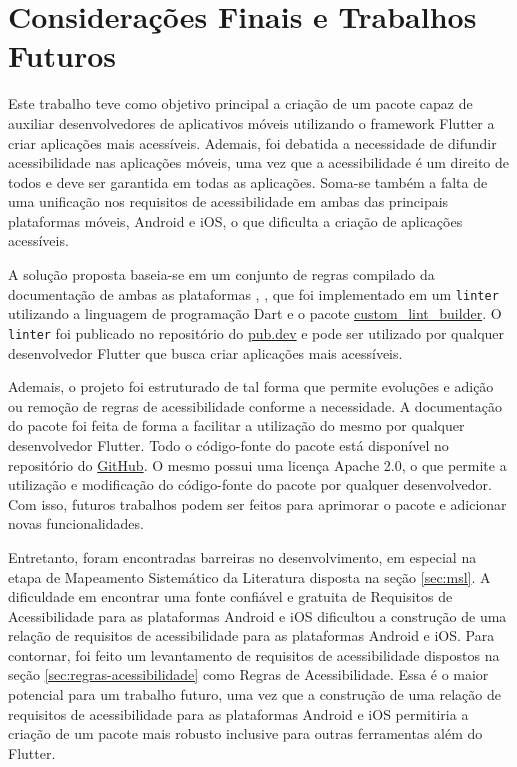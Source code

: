 \chapter{Considerações Finais e Trabalhos Futuros}

Este trabalho teve como objetivo principal a criação de um pacote capaz de auxiliar desenvolvedores de aplicativos móveis utilizando o framework Flutter a criar aplicações mais acessíveis. Ademais, foi debatida a necessidade de difundir acessibilidade nas aplicações móveis, uma vez que a acessibilidade é um direito de todos e deve ser garantida em todas as aplicações. Soma-se também a falta de uma unificação nos requisitos de acessibilidade em ambas das principais plataformas móveis, Android e iOS, o que dificulta a criação de aplicações acessíveis.

A solução proposta baseia-se em um conjunto de regras compilado da documentação de ambas as plataformas \cite{iosaccessibility}, \cite{androidaccessibility}, que foi implementado em um \texttt{linter} utilizando a linguagem de programação Dart e o pacote \href{https://pub.dev/packages/custom_lint_builder}{custom\_lint\_builder}. O \texttt{linter} foi publicado no repositório do \href{https://pub.dev/packages/accessibility_lint}{pub.dev} e pode ser utilizado por qualquer desenvolvedor Flutter que busca criar aplicações mais acessíveis.

Ademais, o projeto foi estruturado de tal forma que permite evoluções e adição ou remoção de regras de acessibilidade conforme a necessidade. A documentação do pacote foi feita de forma a facilitar a utilização do mesmo por qualquer desenvolvedor Flutter. Todo o código-fonte do pacote está disponível no repositório do \href{https://github.com/MateuxLucax/accessibility-lint}{GitHub}. O mesmo possui uma licença Apache 2.0, o que permite a utilização e modificação do código-fonte do pacote por qualquer desenvolvedor. Com isso, futuros trabalhos podem ser feitos para aprimorar o pacote e adicionar novas funcionalidades.

Entretanto, foram encontradas barreiras no desenvolvimento, em especial na etapa de Mapeamento Sistemático da Literatura disposta na seção \ref{sec:msl}. A dificuldade em encontrar uma fonte confiável e gratuita de Requisitos de Acessibilidade para as plataformas Android e iOS dificultou a construção de uma relação de requisitos de acessibilidade para as plataformas Android e iOS. Para contornar, foi feito um levantamento de requisitos de acessibilidade dispostos na seção \ref{sec:regras-acessibilidade} como Regras de Acessibilidade. Essa é o maior potencial para um trabalho futuro, uma vez que a construção de uma relação de requisitos de acessibilidade para as plataformas Android e iOS permitiria a criação de um pacote mais robusto inclusive para outras ferramentas além do Flutter.

